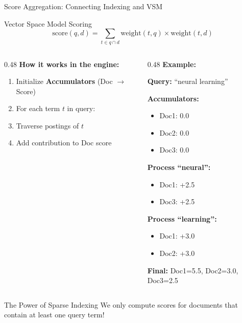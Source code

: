 \documentclass[aspectratio=169]{beamer}
\begin{document}
\begin{frame}{Score Aggregation: Connecting Indexing and VSM}
\begin{block}{Vector Space Model Scoring}
\[ \text{score}(q, d) = \sum_{t \in q \cap d} \text{weight}(t, q) \times \text{weight}(t, d) \]
\end{block}

\begin{columns}[T]
\begin{column}{0.48\textwidth}
\textbf{How it works in the engine:}
\begin{enumerate}
    \item Initialize \textbf{Accumulators} (Doc $\rightarrow$ Score)
    \item For each term $t$ in query:
    \item Traverse postings of $t$
    \item Add contribution to Doc score
\end{enumerate}
\end{column}
\begin{column}{0.48\textwidth}
\textbf{Example:}

\textbf{Query:} ``neural learning''

\vspace{0.3em}

\textbf{Accumulators:}
\begin{itemize}
    \item[] Doc1: 0.0
    \item[] Doc2: 0.0
    \item[] Doc3: 0.0
\end{itemize}

\vspace{0.3em}

\textbf{Process ``neural'':}
\begin{itemize}
    \item[] Doc1: +2.5
    \item[] Doc3: +2.5
\end{itemize}

\vspace{0.3em}

\textbf{Process ``learning'':}
\begin{itemize}
    \item[] Doc1: +3.0
    \item[] Doc2: +3.0
\end{itemize}

\vspace{0.3em}

\textbf{Final:} Doc1=5.5, Doc2=3.0, Doc3=2.5
\end{column}
\end{columns}

\vspace{0.5em}
\begin{exampleblock}{The Power of Sparse Indexing}
We only compute scores for documents that contain at least one query term!
\end{exampleblock}
\end{frame}
\end{document}
